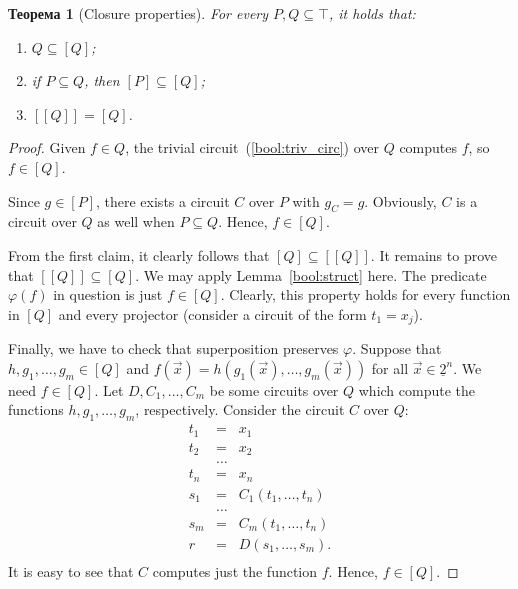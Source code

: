 \documentclass[12pt,notitlepage]{article}
\theoremstyle{plain}
\newtheorem{thm}{Теорема}[section]
\theoremstyle{definition}
\theoremstyle{plain}
\newcommand{\sbs}{\subseteq}
\renewcommand{\phi}{\varphi}
\newcommand{\ul}[1]{\underline{#1}}
\newcommand{\1}{\mathbf{1}}
\newcommand{\0}{\mathbf{0}}
\newcommand{\mcomm}[1]{}
\begin{document}
\mcomm{This lemma reduces the inductive definition for clones to our chosen function `representation', be it a circuit, a formula or whatever. It states that $[Q]$ (as defined in representation terms) is included into every clone containing $Q$. On the other hand, the following theorem implies that $[Q]$ is indeed a clone (that is, $\bot \sbs Q$ and $[Q]$ is closed under superposition) and contains $Q$. So, $[Q]$ is the ${\sbs}$-least clone containing $Q$; this provides an abstraction layer allowing to mention no circuits in most of the subsequent arguments. We do not do so, nevertheless. If the Instructor likes this approach, he might want to add an explicit lemma stating $[Q]$ to be a clone.}
\begin{thm}[Closure properties]\label{bool:closure}
	For every $P, Q \sbs \top$, it holds that:
	\begin{enumerate}
		\item $Q \sbs [Q]$;
		\item if $P \sbs Q$, then $[P] \sbs [Q]$;
		\item $[[Q]] = [Q]$.
	\end{enumerate}
\end{thm}
\begin{proof}
	Given $f \in Q$, the trivial circuit~(\ref{bool:triv_circ}) over $Q$ computes $f$, so $f \in [Q]$.
	
	Since $g \in [P]$, there exists a circuit $C$ over $P$ with $g_C = g$. Obviously, $C$ is a circuit over $Q$ as well when $P \sbs Q$. Hence, $f \in [Q]$.
	
	From the first claim, it clearly follows that $[Q] \sbs [[Q]]$. It remains to prove that $[[Q]] \sbs [Q]$. We may apply Lemma~\ref{bool:struct} here. The predicate $\phi(f)$ in question is just $f \in [Q]$. Clearly, this property holds for every function in $[Q]$ and every projector (consider a circuit of the form $t_1 = x_j$).
	
	Finally, we have to check that superposition preserves $\phi$. Suppose that $h, g_1, \ldots, g_m \in [Q]$ and $f(\vec x) = h(g_1(\vec x),\ldots, g_m(\vec x))$ for all $\vec x \in \ul{2}^n$. We need $f \in [Q]$. Let $D, C_1, \ldots, C_m$ be some circuits over $Q$ which compute the functions $h, g_1, \ldots, g_m$, respectively. Consider the circuit $C$ over $Q$:
	$$
	\begin{array}{rcl}
		t_1 &=& x_1\\
		t_2 &=& x_2\\
		&\ldots&\\
		t_n &=& x_n\\
		s_1 &=& C_1(t_1, \ldots, t_n)\\
		&\ldots&\\
		s_m &=& C_m(t_1, \ldots, t_n)\\
		r &=& D(s_1,\ldots,s_m).\\
	\end{array}
	$$
	It is easy to see that $C$ computes just the function $f$. Hence, $f \in [Q]$.
\end{proof}
\end{document}
